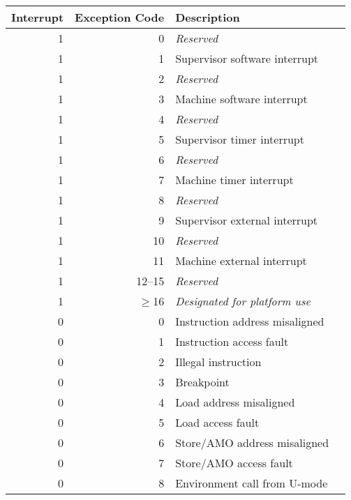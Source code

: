 \begin{table*}[htbp]
\begin{center}
\begin{tabular}{|r|r|l|l|}

  \hline
  Interrupt & Exception Code  & Description \\
  \hline	 
  1         & 0               & {\em Reserved} \\
  1         & 1               & Supervisor software interrupt \\
  1         & 2               & {\em Reserved} \\
  1         & 3               & Machine software interrupt \\ \hline
  1         & 4               & {\em Reserved} \\
  1         & 5               & Supervisor timer interrupt \\
  1         & 6               & {\em Reserved} \\
  1         & 7               & Machine timer interrupt \\ \hline
  1         & 8               & {\em Reserved} \\
  1         & 9               & Supervisor external interrupt \\
  1         & 10              & {\em Reserved} \\
  1         & 11              & Machine external interrupt \\ \hline
  1         & 12--15          & {\em Reserved} \\
  1         & $\ge$16         & {\em Designated for platform use} \\ \hline
  0         & 0               & Instruction address misaligned \\
  0         & 1               & Instruction access fault \\
  0         & 2               & Illegal instruction \\   
  0         & 3               & Breakpoint \\
  0         & 4               & Load address misaligned \\
  0         & 5               & Load access fault \\
  0         & 6               & Store/AMO address misaligned \\
  0         & 7               & Store/AMO access fault \\
  0         & 8               & Environment call from U-mode\\

\end{tabular}
\end{center}
\end{table*}
